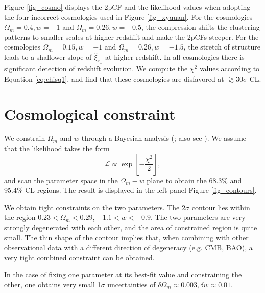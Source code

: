 \documentclass[iop]{emulateapj}
\begin{document}


Figure \ref{fig_cosmo} displays the 2pCF and the likelihood values when adopting 
the four incorrect cosmologies used in Figure \ref{fig_xyquan}.
For the cosmologies $\Omega_m=0.4,w=-1$ and $\Omega_m=0.26,w=-0.5$,
the compression shifts the clustering patterns to smaller scales
at higher redshift and make the 2pCFs steeper.
For the cosmologies $\Omega_m=0.15,w=-1$ and $\Omega_m=0.26,w=-1.5$,
the stretch of structure leads to a shallower slope of $\hat{\xi}_{r_\perp}$ at higher redshift.
In all cosmologies there is significant detection of redshift evolution.
We compute the $\chi^2$ values according to Equation \ref{eq:chisq1}, 
and find that these cosmologies are disfavored 
at $\gtrsim30\sigma$ CL.






\section{Cosmological constraint}


We constrain $\Omega_m$ and $w$ through a Bayesian analysis (\cite{Bayesian}; also see \cite{LB2002,Li2016}).
We assume that the likelihood takes the form
\begin{equation}\label{eq:like}
 \mathcal{L} \propto \exp\left[-\frac{\chi^2}{2}\right],
\end{equation}
and scan the parameter space in the $\Omega_m-w$ plane to obtain the 68.3\% and 95.4\% CL regions.
The result is displayed in the left panel Figure \ref{fig_contours}.


We obtain tight constraints on the two parameters.
The 2$\sigma$ contour lies within the region $0.23<\Omega_m<0.29$, $-1.1<w<-0.9$.
The two parameters are very strongly degenerated with each other,
and the area of constrained region is quite small.
The thin shape of the contour implies that, 
when combining with other observational data with a different direction of degeneracy (e.g. CMB, BAO),
a very tight combined constraint can be obtained.

In the case of fixing one parameter at its best-fit value and constraining the other,
one obtains very small 1$\sigma$ uncertainties of $\delta\Omega_m\approx0.003,\delta w\approx0.01$.
\end{document}
